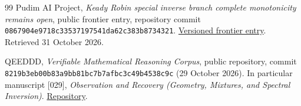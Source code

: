 \documentclass[11pt,a4paper]{article}
\theoremstyle{definition}\newtheorem{definition}[theorem]{Definition}
\theoremstyle{remark}\newtheorem{remark}[theorem]{Remark}
\begin{document}
\begin{thebibliography}{99}
Pudim AI Project,
\emph{Keady Robin special inverse branch complete monotonicity
remains open}, public frontier entry, repository commit
\texttt{0867904e9718c33537197541da62c383b8734321}.
\href{https://github.com/pudim-project/pudim-ai-demo-zetalaw/blob/0867904e9718c33537197541da62c383b8734321/wiki/latest/wiki/nodes/T-Keady-special-Robin-inverse-CM-frontier.md}{Versioned frontier entry}.
Retrieved 31 October 2026.

QEEDDD,
\emph{Verifiable Mathematical Reasoning Corpus}, public repository,
commit \texttt{8219b3eb00b83a9bb81bc7b7afbc3c49b4538c9c}
(29 October 2026). In particular manuscript [029],
\emph{Observation and Recovery (Geometry, Mixtures, and Spectral
Inversion)}.
\href{https://github.com/QEEDDD/Verifiable-Mathematical-Reasoning-Corpus}{Repository}.

\end{thebibliography}
\end{document}
